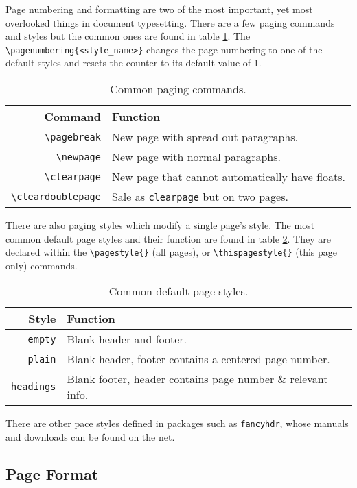 Page numbering and formatting are two of the most important, yet most
overlooked things in document typesetting.  There are a few paging
commands and styles but the common ones are found in table
\ref{t:page}.  The \verb|\pagenumbering{<style_name>}| changes the
page numbering to one of the default styles and resets the counter to
its default value of 1.
\begin{table}[!htbp]
    \centering
    \caption{Common paging commands.}
    \label{t:page}
    \begin{tabular}{rl}
        \toprule
        Command & Function \\
        \midrule
        \verb|\pagebreak| & New page with spread out paragraphs. \\
        \verb|\newpage| & New page with normal paragraphs. \\
        \verb|\clearpage| & New page that cannot automatically have floats. \\
        \verb|\cleardoublepage| & Sale as \verb|clearpage| but on two pages. \\
        \bottomrule
    \end{tabular}
\end{table}

There are also paging styles which modify a single page's style.  The
most common default page styles and their function are found in table
\ref{t:pagestyle}.  They are declared within the \verb|\pagestyle{}|
(all pages), or \verb|\thispagestyle{}| (this page only) commands.
\begin{table}[!htbp]
    \centering
    \caption{Common default page styles.}
    \label{t:pagestyle}
    \begin{tabular}{rl}
        \toprule
        Style & Function \\
        \midrule
        \verb|empty| & Blank header and footer. \\
        \verb|plain| & Blank header, footer contains a centered page number.\\
        \verb|headings| & Blank footer, header contains page number \& relevant info. \\
        \bottomrule
    \end{tabular}
\end{table}

%
There are other pace styles defined in packages such as
\verb|fancyhdr|, whose manuals and downloads can be found on the net.

\subsection{Page Format}
%

